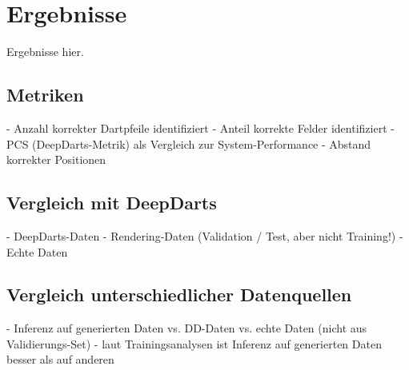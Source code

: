 
\section{Ergebnisse}
\label{sec:ki:ergebnisse}

Ergebnisse hier.


\subsection{Metriken}
\label{sec:ki_metriken}

- Anzahl korrekter Dartpfeile identifiziert
- Anteil korrekte Felder identifiziert
- PCS (DeepDarts-Metrik) als Vergleich zur System-Performance
- Abstand korrekter Positionen



\subsection{Vergleich mit DeepDarts}
\label{seC:vergleich_dd}

- DeepDarts-Daten
- Rendering-Daten (Validation / Test, aber nicht Training!)
- Echte Daten



\subsection{Vergleich unterschiedlicher Datenquellen}
\label{sec:unterschiedliche_datenquellen}

- Inferenz auf generierten Daten vs. DD-Daten vs. echte Daten (nicht aus Validierungs-Set)
- laut Trainingsanalysen ist Inferenz auf generierten Daten besser als auf anderen

